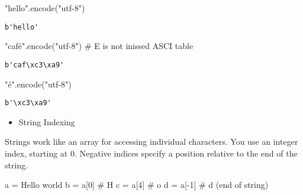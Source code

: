 \documentclass[
  letterpaper,
  DIV=11,
  numbers=noendperiod]{scrreprt}
\newenvironment{Shaded}{\begin{snugshade}}{\end{snugshade}}
\newcommand{\CommentTok}[1]{\textcolor[rgb]{0.37,0.37,0.37}{#1}}
\newcommand{\DecValTok}[1]{\textcolor[rgb]{0.68,0.00,0.00}{#1}}
\newcommand{\NormalTok}[1]{\textcolor[rgb]{0.00,0.46,0.62}{#1}}
\newcommand{\OperatorTok}[1]{\textcolor[rgb]{0.37,0.37,0.37}{#1}}
\newcommand{\NormalTok}[1]{\textcolor[rgb]{0.00,0.48,0.65}{#1}}
\newcommand{\OperatorTok}[1]{\textcolor[rgb]{0.37,0.37,0.37}{#1}}
\newcommand{\StringTok}[1]{\textcolor[rgb]{0.13,0.47,0.30}{#1}}
\providecommand{\tightlist}{%
  \setlength{\itemsep}{0pt}\setlength{\parskip}{0pt}}
\begin{document}
\begin{Shaded}
\begin{Highlighting}[]
\begin{Shaded}
\begin{Highlighting}[]
\CommentTok{"hello"}\NormalTok{.encode(}\StringTok{"utf{-}8"}\NormalTok{)}
\end{Highlighting}
\end{Shaded}

\begin{verbatim}
b'hello'
\end{verbatim}

\begin{Shaded}
\begin{Highlighting}[]
\CommentTok{"café"}\NormalTok{.encode(}\StringTok{"utf{-}8"}\NormalTok{) }\CommentTok{\# E is not inissed ASCI table}
\end{Highlighting}
\end{Shaded}

\begin{verbatim}
b'caf\xc3\xa9'
\end{verbatim}

\begin{Shaded}
\begin{Highlighting}[]
\CommentTok{"é"}\NormalTok{.encode(}\StringTok{"utf{-}8"}\NormalTok{)}
\end{Highlighting}
\end{Shaded}

\begin{verbatim}
b'\xc3\xa9'
\end{verbatim}

\begin{itemize}
\tightlist
\item
  String Indexing
\end{itemize}

Strings work like an array for accessing individual characters. You use
an integer index, starting at 0. Negative indices specify a position
relative to the end of the string.

\begin{Shaded}
\begin{Highlighting}[]
\NormalTok{a }\OperatorTok{=} \StringTok{\textquotesingle{}Hello world\textquotesingle{}}
\NormalTok{b }\OperatorTok{=}\NormalTok{ a[}\DecValTok{0}\NormalTok{]          }\CommentTok{\# \textquotesingle{}H\textquotesingle{}}
\NormalTok{c }\OperatorTok{=}\NormalTok{ a[}\DecValTok{4}\NormalTok{]          }\CommentTok{\# \textquotesingle{}o\textquotesingle{}}
\NormalTok{d }\OperatorTok{=}\NormalTok{ a[}\OperatorTok{{-}}\DecValTok{1}\NormalTok{]         }\CommentTok{\# \textquotesingle{}d\textquotesingle{} (end of string)}
\end{Highlighting}
\end{Shaded}


\end{Highlighting}
\end{Shaded}
\end{document}

